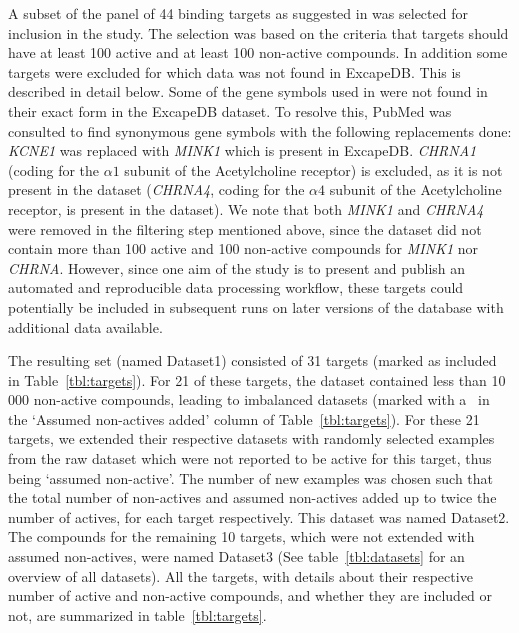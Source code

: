 \documentclass[utf8]{frontiersSCNS} %
\begin{document}
A subset of the panel of 44 binding targets as suggested in \cite{Bowes2012}
was selected for inclusion in the study. The selection was based on the
criteria that targets should have at least 100 active and at least 100
non-active compounds.  In addition some targets were excluded for which data
was not found in ExcapeDB. This is described in detail below.
%
Some of the gene symbols used in \cite{Bowes2012} were not found in their exact
form in the ExcapeDB dataset. To resolve this, PubMed was consulted to find
synonymous gene symbols with the following replacements done:
%
\textit{KCNE1} was replaced with \textit{MINK1} which is present in ExcapeDB.
\textit{CHRNA1} (coding for the $\alpha1$ subunit of the Acetylcholine
receptor) is excluded, as it is not present in the dataset (\textit{CHRNA4},
coding for the $\alpha4$ subunit of the Acetylcholine receptor, is present in
the dataset). We note that both \textit{MINK1} and \textit{CHRNA4} were removed
in the filtering step mentioned above, since the dataset did not contain more
than 100 active and 100 non-active compounds for \textit{MINK1} nor
\textit{CHRNA}.  However, since one aim of the study is to present and publish
an automated and reproducible data processing workflow, these targets could
potentially be included in subsequent runs on later versions of the database
with additional data available.

The resulting set (named Dataset1) consisted of 31 targets (marked as included in
Table~\ref{tbl:targets}).  For 21 of these targets, the dataset contained less
than 10\,000 non-active compounds, leading to imbalanced datasets (marked with
a \checkmark\ in the `Assumed non-actives added' column of Table~\ref{tbl:targets}).
%
For these 21 targets, we extended their respective datasets with randomly
selected examples from the raw dataset which were not reported to be active for
this target, thus being `assumed non-active'. The number of new examples was chosen such that the total
number of non-actives and assumed non-actives added up to twice the number of
actives, for each target respectively. This dataset was named Dataset2.
The compounds for the remaining 10 targets, which were not extended with
assumed non-actives, were named Dataset3 (See table~\ref{tbl:datasets} for
an overview of all datasets).
%
All the targets, with details about their respective number of active and
non-active compounds, and whether they are included or not, are summarized in
table~\ref{tbl:targets}.
\end{document}
